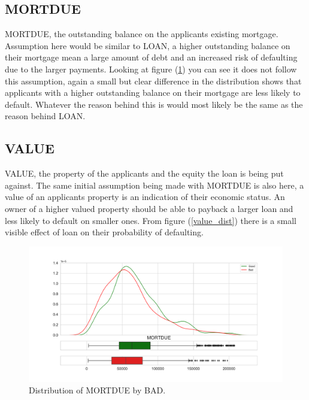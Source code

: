 \subsection*{MORTDUE}

MORTDUE,  the outstanding balance on the applicants existing mortgage. Assumption here would be similar to LOAN,  a higher outstanding balance on their mortgage mean a large amount of debt and an increased risk of defaulting due to the larger payments. Looking at figure (\ref{mortdue_dist}) you can see it does not follow this assumption,  again a small but clear difference in the distribution shows that applicants with a higher outstanding balance on their mortgage are less likely to default. Whatever the reason behind this is would most likely be the same as the reason behind LOAN.

\subsection*{VALUE}

VALUE,  the property of the applicants and the equity the loan is being put against. The same initial assumption being made with MORTDUE is also here,  a value of an applicants property is an indication of their economic status. An owner of a higher valued property should be able to payback a larger loan and less likely to default on smaller ones. From figure (\ref{value_dist}) there is a small visible effect of loan on their probability of defaulting.

\begin{figure}[!ht]
	\centering
	\includegraphics[scale=0.40]{figs/mortdue_dist.pdf}
	\caption{Distribution of MORTDUE by BAD. \label{mortdue_dist}}
\end{figure}

